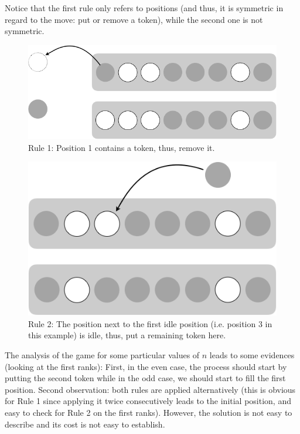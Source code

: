 Notice that the first rule only refers to positions (and thus, it is symmetric in regard to the move: put or remove a token), 
while the second one is not symmetric.

\begin{figure}[h]
\begin{center}
        \includegraphics[scale=0.4]{FiguresMaths/GameTokenRule1.png}
        \caption{Rule 1: Position 1 contains a token, thus, remove it.}
        \label{fig:rule1}
\end{center}
\end{figure}

\begin{figure}[h]
\begin{center}
        \includegraphics[scale=0.4]{FiguresMaths/GameTokenRule2.png}
        \caption{Rule 2: The position next to the first idle position (i.e. position 3 in this example) 
        is idle, thus, put a remaining token here.}
        \label{fig:rule2}
\end{center}
\end{figure}

The analysis of the game for some particular values of $n$ leads to some evidences (looking at the first ranks):
First, in the even case, the process should start by putting the second token while in the odd case, we should start to fill the first position.
Second observation: both rules are applied alternatively (this is obvious for Rule 1 since applying it twice consecutively leads to the initial position, 
and easy to check for Rule 2 on the first ranks). 
However, the solution is not easy to describe and its cost is not easy to establish.


